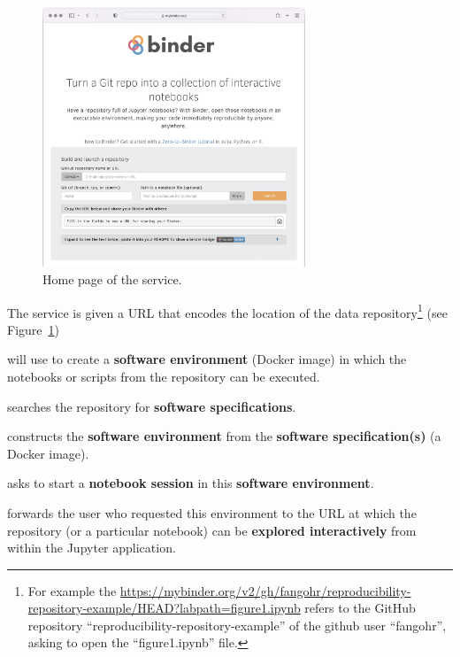 \begin{figure}[ht]
  \centering
    \includegraphics[width=0.7\textwidth]{images/mybinder.png}
    \caption{Home page of the \mybinder{} service.}
    \label{fig:mybinder-homepage}
\end{figure}

\begin{compactitem}
\item The \binderhub{} service is given a URL that encodes the location of the data
  repository\footnote{For example the
    {\url{https://mybinder.org/v2/gh/fangohr/reproducibility-repository-example/HEAD?labpath=figure1.ipynb}}
    refers to the GitHub repository ``reproducibility-repository-example'' of the
    github user ``fangohr'', asking to open the ``figure1.ipynb'' file.}
  (see Figure~\ref{fig:mybinder-homepage})
\item \binderhub{} will use
  \repotodocker{} to create a \textbf{software environment} (Docker image)
  in which the notebooks or scripts from the repository can be executed.
\item \repotodocker{} searches the repository for \textbf{software specifications}.
\item \repotodocker{} constructs the \textbf{software environment}
  from the \textbf{software specification(s)} (a Docker image).
\item \binderhub{} asks \JupyterHub to start
  a \textbf{notebook session} in this \textbf{software environment}.
\item \binderhub{} forwards the user who requested this environment to
  the URL at which the repository (or a particular notebook) can be
  \textbf{explored interactively} from within the Jupyter application.
\end{compactitem}

